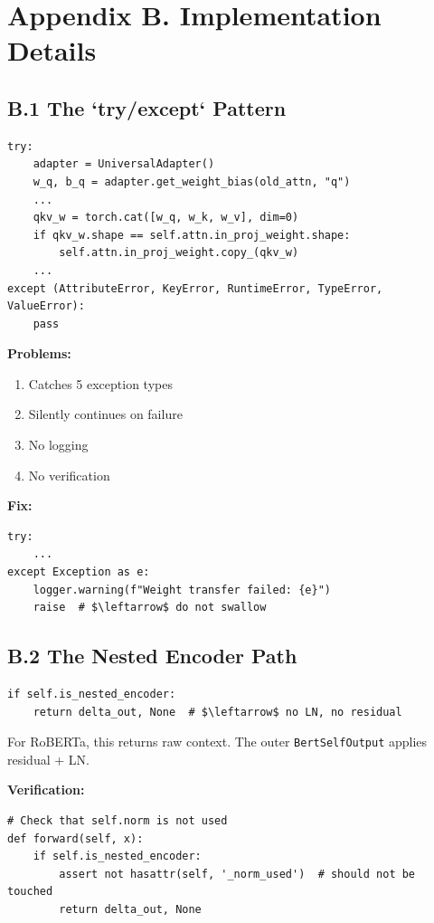 
\section{Appendix B. Implementation Details}

\subsection{B.1 The `try/except` Pattern}

\begin{lstlisting}
try:
    adapter = UniversalAdapter()
    w_q, b_q = adapter.get_weight_bias(old_attn, "q")
    ...
    qkv_w = torch.cat([w_q, w_k, w_v], dim=0)
    if qkv_w.shape == self.attn.in_proj_weight.shape:
        self.attn.in_proj_weight.copy_(qkv_w)
    ...
except (AttributeError, KeyError, RuntimeError, TypeError, ValueError):
    pass
\end{lstlisting}

\textbf{Problems:}
\begin{enumerate}
\item Catches 5 exception types
\item Silently continues on failure
\item No logging
\item No verification

\end{enumerate}
\textbf{Fix:}

\begin{lstlisting}
try:
    ...
except Exception as e:
    logger.warning(f"Weight transfer failed: {e}")
    raise  # $\leftarrow$ do not swallow
\end{lstlisting}

\subsection{B.2 The Nested Encoder Path}

\begin{lstlisting}
if self.is_nested_encoder:
    return delta_out, None  # $\leftarrow$ no LN, no residual
\end{lstlisting}

For RoBERTa, this returns raw context. The outer \texttt{BertSelfOutput} applies 
residual + LN.

\textbf{Verification:}

\begin{lstlisting}
# Check that self.norm is not used
def forward(self, x):
    if self.is_nested_encoder:
        assert not hasattr(self, '_norm_used')  # should not be touched
        return delta_out, None
\end{lstlisting}

